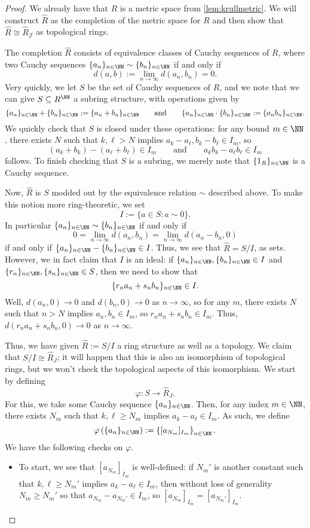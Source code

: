 \begin{proof}
	We already have that $R$ is a metric space from \autoref{lem:krullmetric}. We will construct $\widehat R$ as the completion of the metric space for $R$ and then show that $\widehat R\cong\widehat R_\mathcal J$ as topological rings.

	The completion $\widehat R$ consists of equivalence classes of Cauchy sequences of $R$, where two Cauchy sequences $\{a_n\}_{n\in\NN}\sim\{b_n\}_{n\in\NN}$ if and only if
	\[d(a,b):=\lim_{n\to\infty}d(a_n,b_n)=0.\]
	Very quickly, we let $S$ be the set of Cauchy sequences of $R$, and we note that we can give $S\subseteq R^\NN$ a subring structure, with operations given by
	\[\{a_n\}_{n\in\NN}+\{b_n\}_{n\in\NN}:=\{a_n+b_n\}_{n\in\NN}\qquad\text{and}\qquad\{a_n\}_{n\in\NN}\cdot\{b_n\}_{n\in\NN}:=\{a_nb_n\}_{n\in\NN}.\]
	We quickly check that $S$ is closed under these operations: for any bound $m\in\NN$, there exists $N$ such that $k,\ell>N$ implies $a_k-a_\ell,b_k-b_\ell\in I_m$, so
	\[(a_k+b_k)-(a_\ell+b_\ell)\in I_m\qquad\text{and}\qquad a_kb_k-a_\ell b_\ell\in I_m\]
	follows. To finish checking that $S$ is a subring, we merely note that $\{1_R\}_{n\in\NN}$ is a Cauchy sequence.
	
	Now, $\widehat R$ is $S$ modded out by the equivalence relation $\sim$ described above. To make this notion more ring-theoretic, we set
	\[I:=\{a\in S:a\sim0\}.\]
	In particular $\{a_n\}_{n\in\NN}\sim\{b_n\}_{n\in\NN}$ if and only if
	\[0=\lim_{n\to\infty}d(a_n,b_n)=\lim_{n\to\infty}d(a_n-b_n,0)\]
	if and only if $\{a_n\}_{n\in\NN}-\{b_n\}_{n\in\NN}\in I$. Thus, we see that $\widehat R=S/I$, as sets. However, we in fact claim that $I$ is an ideal: if $\{a_n\}_{n\in\NN},\{b_n\}_{n\in\NN}\in I$ and $\{r_n\}_{n\in\NN},\{s_n\}_{n\in\NN}\in S$, then we need to show that
	\[\{r_na_n+s_nb_n\}_{n\in\NN}\in I.\]
	Well, $d(a_n,0)\to0$ and $d(b_n,0)\to0$ as $n\to\infty$, so for any $m$, there exists $N$ such that $n>N$ implies $a_n,b_n\in I_m$, so $r_na_n+s_nb_n\in I_m$. Thus, $d(r_na_n+s_nb_n,0)\to0$ as $n\to\infty$.

	Thus, we have given $\widehat R:=S/I$ a ring structure as well as a topology. We claim that $S/I\cong\widehat R_J$; it will happen that this is also an isomorphism of topological rings, but we won't check the topological aspects of this isomorphism. We start by defining
	\[\varphi:S\to\widehat R_J.\]
	For this, we take some Cauchy sequence $\{a_n\}_{n\in\NN}$. Then, for any index $m\in\NN$, there exists $N_m$ such that $k,\ell\ge N_m$ implies $a_k-a_\ell\in I_m$. As such, we define
	\[\varphi\left(\{a_n\}_{n\in\NN}\right):=\left\{[a_{N_m}]_{I_m}\right\}_{n\in\NN}.\]
	We have the following checks on $\varphi$.
	\begin{itemize}
		\item To start, we see that $[a_{N_m}]_{I_m}$ is well-defined: if $N_m'$ is another constant such that $k,\ell\ge N_m'$ implies $a_k-a_\ell\in I_m$, then without loss of generality $N_m\ge N_m'$ so that $a_{N_m}-a_{N_m'}\in I_m$, so $[a_{N_m}]_{I_m}=[a_{N_m'}]_{I_m}$.
	

\end{itemize}
\end{proof}
